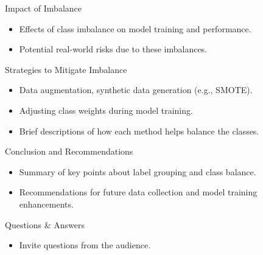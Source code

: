 \documentclass{beamer}
\begin{document}
\begin{frame}{Impact of Imbalance}
  \begin{itemize}
    \item Effects of class imbalance on model training and performance.
    \item Potential real-world risks due to these imbalances.
  \end{itemize}
\end{frame}

\begin{frame}{Strategies to Mitigate Imbalance}
  \begin{itemize}
    \item Data augmentation, synthetic data generation (e.g., SMOTE).
    \item Adjusting class weights during model training.
    \item Brief descriptions of how each method helps balance the classes.
  \end{itemize}
\end{frame}

\begin{frame}{Conclusion and Recommendations}
  \begin{itemize}
    \item Summary of key points about label grouping and class balance.
    \item Recommendations for future data collection and model training enhancements.
  \end{itemize}
\end{frame}

\begin{frame}{Questions \& Answers}
  \begin{itemize}
    \item Invite questions from the audience.
  \end{itemize}
\end{frame}
\end{document}
